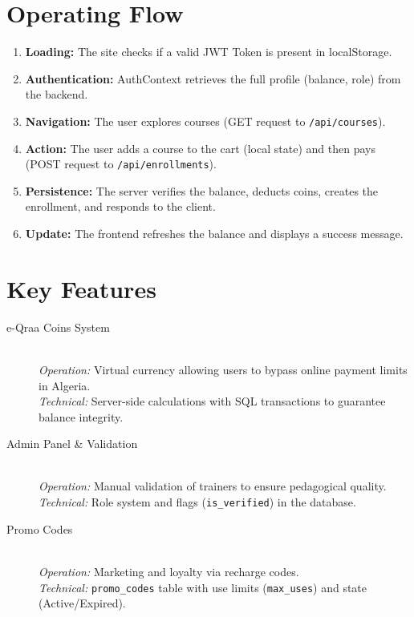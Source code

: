 \documentclass[12pt,a4paper]{article}
\begin{document}
\section{Operating Flow}
\begin{enumerate}
    \item \textbf{Loading:} The site checks if a valid JWT Token is present in localStorage.
    \item \textbf{Authentication:} AuthContext retrieves the full profile (balance, role) from the backend.
    \item \textbf{Navigation:} The user explores courses (GET request to \texttt{/api/courses}).
    \item \textbf{Action:} The user adds a course to the cart (local state) and then pays (POST request to \texttt{/api/enrollments}).
    \item \textbf{Persistence:} The server verifies the balance, deducts coins, creates the enrollment, and responds to the client.
    \item \textbf{Update:} The frontend refreshes the balance and displays a success message.
\end{enumerate}

\section{Key Features}
\begin{description}
    \item[e-Qraa Coins System] \hfill \\
    \textit{Operation:} Virtual currency allowing users to bypass online payment limits in Algeria. \\
    \textit{Technical:} Server-side calculations with SQL transactions to guarantee balance integrity.
    
    \item[Admin Panel \& Validation] \hfill \\
    \textit{Operation:} Manual validation of trainers to ensure pedagogical quality. \\
    \textit{Technical:} Role system and flags (\texttt{is\_verified}) in the database.
    
    \item[Promo Codes] \hfill \\
    \textit{Operation:} Marketing and loyalty via recharge codes. \\
    \textit{Technical:} \texttt{promo\_codes} table with use limits (\texttt{max\_uses}) and state (Active/Expired).
\end{description}
\end{document}
